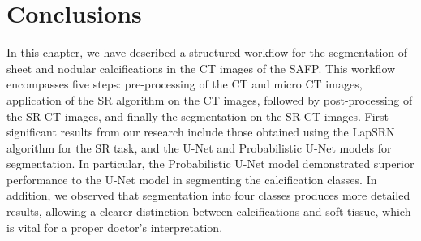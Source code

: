 \section{Conclusions}
In this chapter, we have described  a structured workflow for the segmentation of sheet and
nodular calcifications in the CT images of the SAFP. This workflow encompasses
five steps: pre-processing of the CT and micro CT images, application of the
SR algorithm on the CT images, followed by post-processing of the SR-CT images, 
and finally the segmentation on the SR-CT images. 
First significant results from our research include those obtained using the LapSRN
algorithm for the SR task, and the U-Net and Probabilistic U-Net models for
segmentation. In particular, the Probabilistic U-Net model demonstrated superior
performance to the U-Net model in segmenting the calcification classes. In
addition, we observed that segmentation into four classes produces more detailed
results, allowing a clearer distinction between calcifications and soft tissue,
which is vital for a proper doctor's interpretation.
